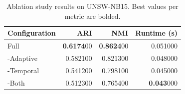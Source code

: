 \begin{table}
\caption{Ablation study results on UNSW-NB15. Best values per metric are bolded.}
\begin{tabular}{lrrr}
\toprule
Configuration & ARI & NMI & Runtime (s) \\
\midrule
Full & \textbf{0.6174}00 & \textbf{0.8624}00 & 0.051000 \\
-Adaptive & 0.582100 & 0.821300 & 0.048000 \\
-Temporal & 0.541200 & 0.798100 & 0.045000 \\
-Both & 0.512300 & 0.765400 & \textbf{0.043}000 \\
\bottomrule
\end{tabular}
\end{table}
